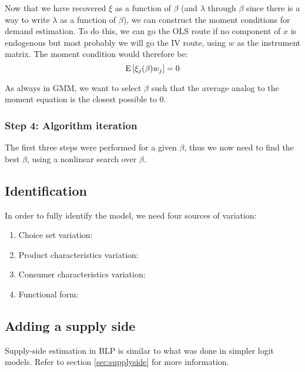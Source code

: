 Now that we have recovered $\xi$ as a function of $\beta$ (and $\lambda$ through $\beta$ since there is a way to write $\lambda$ as a function of $\beta$), we can construct the moment conditions for demand estimation. To do this, we can go the OLS route if no component of $x$ is endogenous but most probably we will go the IV route, using $w$ as the instrument matrix. The moment condition would therefore be: $$ \operatorname{E}\left[\xi_j(\beta) w_j\right] = 0 $$

As always in GMM, we want to select $\beta$ such that the average analog to the moment equation is the closest possible to 0.

\subsubsection{Step 4: Algorithm iteration}

The first three steps were performed for a given $\beta$, thus we now need to find the best $\beta$, using a nonlinear search over $\beta$.

\subsection{Identification}

In order to fully identify the model, we need four sources of variation:\begin{enumerate}
\item Choice set variation:
\item Product characteristics variation:
\item Consumer characteristics variation:
\item Functional form:
\end{enumerate}

\subsection{Adding a supply side}

Supply-side estimation in BLP is similar to what was done in simpler logit models. Refer to section \ref{sec:supplyside} for more information.
